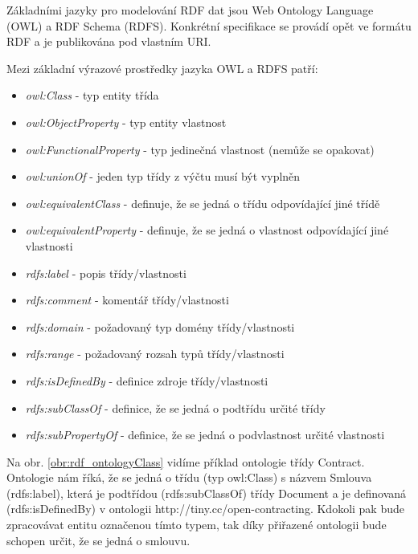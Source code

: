 Základními jazyky pro modelování RDF dat jsou Web Ontology Language (OWL)\cite{OWL} a RDF Schema (RDFS)\cite{RdfSchema}. Konkrétní specifikace se provádí opět ve formátu RDF a je publikována pod vlastním URI.

Mezi základní výrazové prostředky jazyka OWL a RDFS patří:

\begin{itemize}
\item \textit{owl:Class} - typ entity třída
\item \textit{owl:ObjectProperty} - typ entity vlastnost
\item \textit{owl:FunctionalProperty} - typ jedinečná vlastnost (nemůže se opakovat)
\item \textit{owl:unionOf} - jeden typ třídy z výčtu musí být vyplněn 
\item \textit{owl:equivalentClass} - definuje, že se jedná o třídu odpovídající jiné třídě
\item \textit{owl:equivalentProperty} - definuje, že se jedná o vlastnost odpovídající jiné vlastnosti
\item \textit{rdfs:label} - popis třídy/vlastnosti
\item \textit{rdfs:comment} - komentář třídy/vlastnosti
\item \textit{rdfs:domain} - požadovaný  typ domény třídy/vlastnosti
\item \textit{rdfs:range} - požadovaný rozsah typů třídy/vlastnosti
\item \textit{rdfs:isDefinedBy} - definice zdroje třídy/vlastnosti
\item \textit{rdfs:subClassOf} - definice, že se jedná o podtřídu určité třídy  
\item \textit{rdfs:subPropertyOf} - definice, že se jedná o podvlastnost určité vlastnosti  
\end{itemize}

Na obr. \ref{obr:rdf_ontologyClass} vidíme příklad ontologie třídy Contract. Ontologie nám říká, že se jedná o třídu (typ owl:Class) s názvem Smlouva (rdfs:label), která je podtřídou (rdfs:subClassOf) třídy Document a je definovaná (rdfs:isDefinedBy) v ontologii http://tiny.cc/open-contracting. Kdokoli pak bude zpracovávat entitu označenou tímto typem, tak díky přiřazené ontologii bude schopen určit, že se jedná o smlouvu.

